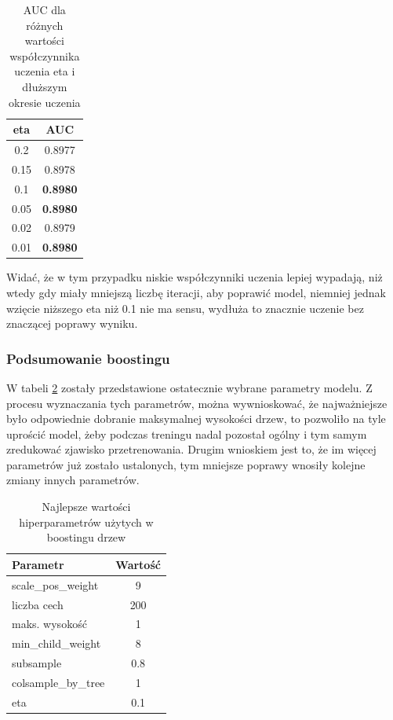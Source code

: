 \documentclass[12pt]{article}
\begin{document}
\begin{table}[h]
    \centering
    \begin{tabular}{|c|c|}
    \hline
        eta & AUC \\ \hline
        0.2 & 0.8977 \\ \hline 
        0.15 & 0.8978 \\ \hline 
        0.1 & \textbf{0.8980} \\ \hline 
        0.05 & \textbf{0.8980} \\ \hline 
        0.02 & 0.8979 \\ \hline 
        0.01 & \textbf{0.8980} \\ \hline 
    \end{tabular}
    \caption{AUC dla różnych wartości współczynnika uczenia eta i dłuższym okresie uczenia}
    \label{tab:xgboost_eta_longer}
\end{table}

Widać, że w tym przypadku niskie współczynniki uczenia lepiej wypadają, niż wtedy gdy miały mniejszą liczbę iteracji, aby poprawić model, niemniej jednak wzięcie niższego eta niż 0.1 nie ma sensu, wydłuża to znacznie uczenie bez znaczącej poprawy wyniku.

\subsubsection{Podsumowanie boostingu}

W tabeli \ref{tab:xgboost_best_params} zostały przedstawione ostatecznie wybrane parametry modelu. Z procesu wyznaczania tych parametrów, można wywnioskować, że najważniejsze było odpowiednie dobranie maksymalnej wysokości drzew, to pozwoliło na tyle uprościć model, żeby podczas treningu nadal pozostał ogólny i tym samym zredukować zjawisko przetrenowania. Drugim wnioskiem jest to, że im więcej parametrów już zostało ustalonych, tym mniejsze poprawy wnosiły kolejne zmiany innych parametrów. 

\begin{table}[h]
    \centering
    \begin{tabular}{l | c }
        Parametr & Wartość \\ \hline
        scale\_pos\_weight & 9 \\
        liczba cech & 200 \\
        maks. wysokość & 1 \\
        min\_child\_weight & 8 \\
        subsample & 0.8 \\
        colsample\_by\_tree & 1 \\
        eta & 0.1 \\
    \end{tabular}
    \caption{Najlepsze wartości hiperparametrów użytych w boostingu drzew}
    \label{tab:xgboost_best_params}
\end{table}
\end{document}

